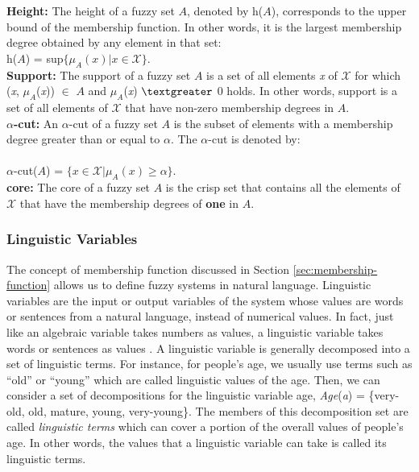 \documentclass[11pt]{article}
\begin{document}
\textbf{Height:} The height of a fuzzy set $\textit{A}$, denoted by
$\textit{h}$($\textit{A}$), corresponds to the upper bound of the membership
function. In other words, it is the largest membership degree obtained by any
element in that set:\\

$\textit{h}$($\textit{A}$) = sup$\{\mu_A(\textit{x}) | \textit{x} \in
\mathcal{X}\}$.\\

\textbf{Support:} The support of a fuzzy set $\textit{A}$ is a set of all
elements \textit{x} of $\mathcal{X}$ for which (\textit{x}, $\mu_A$(\textit{x}))
$\in$ $\textit{A}$ and $\mu_A$(\textit{x}) $\textgreater$ 0 holds. In other
words, support is a set of all elements of $\mathcal{X}$ that have non-zero
membership degrees in $\textit{A}$.\\

\textbf{$\alpha$-cut:} An $\alpha$-cut of a fuzzy set $\textit{A}$ is the subset
of elements with a membership degree greater than or equal to $\alpha$. The
$\alpha$-cut is denoted by:\\ \\$\alpha$-cut($\textit{A}$) = $\{\textit{x} \in
\mathcal{X} | \mu_A(\textit{x}) \geqslant \alpha\}$.\\

\textbf{core:} The core of a fuzzy set $\textit{A}$ is the crisp set that
contains all the elements of $\mathcal{X}$ that have the membership degrees of
\textbf{one} in $\textit{A}$.

\subsubsection{Linguistic Variables}
\label{sec:linguistic-variables}

The concept of membership function discussed in Section
\ref{sec:membership-function} allows us to define fuzzy systems in natural
language. Linguistic variables are the input or output variables of the system
whose values are words or sentences from a natural language, instead of
numerical values. In fact, just like an algebraic variable takes numbers as
values, a linguistic variable takes words or sentences as values
\cite{zimmermann:fuzzy-sets}. A linguistic variable is generally decomposed into
a set of linguistic terms. For instance, for people's age, we usually use terms
such as ``old'' or ``young'' which are called linguistic values of the age.
Then, we can consider a set of decompositions for the linguistic variable age,
\textit{Age}(\textit{a}) = \{very-old, old, mature, young, very-young\}. The
members of this decomposition set are called \textit{linguistic terms} which can
cover a portion of the overall values of people's age. In other words, the
values that a linguistic variable can take is called its linguistic terms.
\end{document}

